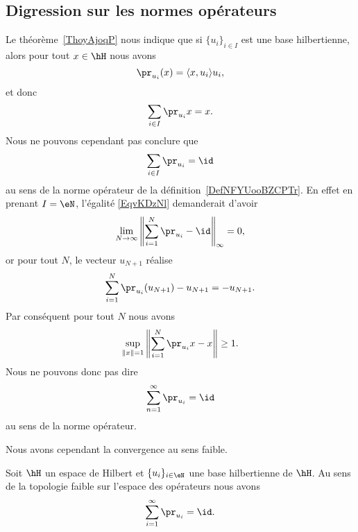 \subsection{Digression sur les normes opérateurs}
\label{subsecaeSywF}

Le théorème~\ref{ThoyAjoqP} nous indique que si \( \{ u_i \}_{i\in I}\) est une base hilbertienne, alors pour tout \( x\in \hH\) nous avons
\begin{equation}
	\pr_{u_i}(x)=\langle x, u_i\rangle u_i,
\end{equation}
et donc
\begin{equation}
	\sum_{i\in I}\pr_{u_i}x=x.
\end{equation}
Nous ne pouvons cependant pas conclure que
\begin{equation}    \label{EqvKDzNl}
	\sum_{i\in I}\pr_{u_i}=\id
\end{equation}
au sens de la norme opérateur de la définition~\ref{DefNFYUooBZCPTr}. En effet en prenant \( I=\eN\), l'égalité \eqref{EqvKDzNl} demanderait d'avoir
\begin{equation}
	\lim_{N\to \infty} \left\| \sum_{i=1}^N\pr_{u_i}-\id \right\|_{\infty}=0,
\end{equation}
or pour tout \( N\), le vecteur \( u_{N+1}\) réalise
\begin{equation}
	\sum_{i=1}^N\pr_{u_i}(u_{N+1})-u_{N+1}=-u_{N+1}.
\end{equation}
Par conséquent pour tout \( N\) nous avons
\begin{equation}
	\sup_{\| x \|=1}\left\| \sum_{i=1}^N\pr_{u_i}x-x \right\|\geq 1.
\end{equation}
Nous ne pouvons donc pas dire
\begin{equation}
	\sum_{n=1}^{\infty}\pr_{u_i}=\id
\end{equation}
au sens de la norme opérateur.

Nous avons cependant la convergence au sens faible.
\begin{proposition}
	Soit \( \hH\) un espace de Hilbert et \( \{ u_i \}_{i\in \eN}\) une base hilbertienne de \( \hH\). Au sens de la topologie faible sur l'espace des opérateurs nous avons
	\begin{equation}
		\sum_{i=1}^{\infty}\pr_{u_i}=\id.
	\end{equation}
\end{proposition}

